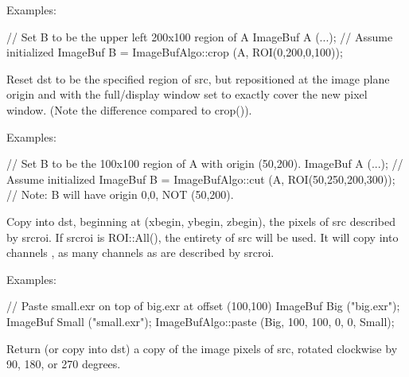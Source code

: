 \smallskip
\noindent Examples:
\begin{code}
    // Set B to be the upper left 200x100 region of A
    ImageBuf A (...);  // Assume initialized
    ImageBuf B = ImageBufAlgo::crop (A, ROI(0,200,0,100));
\end{code}
\apiend


 
Reset {\cf dst} to be the specified region of {\cf src}, but repositioned at
the image plane origin and with the full/display window set to exactly cover
the new pixel window.  (Note the difference compared to {\cf crop()}).

\smallskip
\noindent Examples:
\begin{code}
    // Set B to be the 100x100 region of A with origin (50,200).
    ImageBuf A (...);  // Assume initialized
    ImageBuf B = ImageBufAlgo::cut (A, ROI(50,250,200,300));
    // Note: B will have origin 0,0, NOT (50,200).
\end{code}
\apiend


 
Copy into {\cf dst}, beginning at {\cf (xbegin, ybegin, zbegin)}, the pixels of
{\cf src} described by {\cf srcroi}.  If {\cf srcroi} is {\cf ROI::All()},
the entirety of src will be used.  It will copy into channels
{\cf [chbegin...]}, as many channels as are described by {\cf srcroi}.

\smallskip
\noindent Examples:
\begin{code}
    // Paste small.exr on top of big.exr at offset (100,100)
    ImageBuf Big ("big.exr");
    ImageBuf Small ("small.exr");
    ImageBufAlgo::paste (Big, 100, 100, 0, 0, Small);
\end{code}
\apiend


 
 
 
Return (or copy into {\cf dst}) a copy of the image pixels of {\cf src},
rotated clockwise by 90, 180, or 270 degrees.

